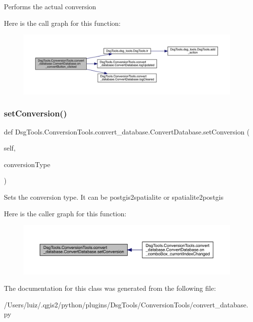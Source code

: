 \begin{DoxyVerb}Performs the actual conversion
\end{DoxyVerb}
 Here is the call graph for this function\+:
\nopagebreak
\begin{figure}[H]
\begin{center}
\leavevmode
\includegraphics[width=350pt]{class_dsg_tools_1_1_conversion_tools_1_1convert__database_1_1_convert_database_a17a29f0021797382f0c379c95a989ff7_cgraph}
\end{center}
\end{figure}
\mbox{\label{class_dsg_tools_1_1_conversion_tools_1_1convert__database_1_1_convert_database_ac695f8034904ba190770122f26bfafa3}} 
\subsubsection{\texorpdfstring{set\+Conversion()}{setConversion()}}
{\footnotesize\ttfamily def Dsg\+Tools.\+Conversion\+Tools.\+convert\+\_\+database.\+Convert\+Database.\+set\+Conversion (\begin{DoxyParamCaption}\item[{}]{self,  }\item[{}]{conversion\+Type }\end{DoxyParamCaption})}

\begin{DoxyVerb}Sets the conversion type. It can be postgis2spatialite or spatialite2postgis
\end{DoxyVerb}
 Here is the caller graph for this function\+:
\nopagebreak
\begin{figure}[H]
\begin{center}
\leavevmode
\includegraphics[width=350pt]{class_dsg_tools_1_1_conversion_tools_1_1convert__database_1_1_convert_database_ac695f8034904ba190770122f26bfafa3_icgraph}
\end{center}
\end{figure}


The documentation for this class was generated from the following file\+:\begin{DoxyCompactItemize}
\item 
/\+Users/luiz/.\+qgis2/python/plugins/\+Dsg\+Tools/\+Conversion\+Tools/convert\+\_\+database.\+py\end{DoxyCompactItemize}
